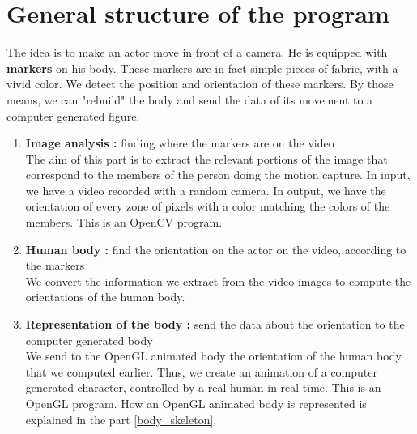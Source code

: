 \documentclass{article}
\begin{document}
    \section{General structure of the program}
The idea is to make an actor move in front of a camera.
He is equipped with \textbf{markers} on his body.
These markers are in fact simple pieces of fabric, with a vivid color.
We detect the position and orientation of these markers.
By those means, we can "rebuild" the body and send the data of its movement
to a computer generated figure.

\begin{enumerate}
    \item \textbf{Image analysis : } finding where the markers are on the video\\
    The aim of this part is to extract the relevant portions of the image that
    correspond to the members of the person doing the motion capture.
    In input, we have a video recorded with a random camera.
    In output, we have the orientation of every zone of pixels with a color matching the colors of the members.
    This is an OpenCV \cite{OpenCV} program.

    \item \textbf{Human body :} find the orientation on the actor on the video, according to the markers\\
    We convert the information we extract from the video images
    to compute the orientations of the human body.

    \item \textbf{Representation of the body :} send the data about the orientation to the computer generated body\\
    We send to the OpenGL animated body the orientation of the human body that we computed earlier.
    Thus, we create an animation of a computer generated character, controlled by a real human in real time.
    This is an OpenGL \cite{OpenGL} program.
    How an OpenGL animated body is represented is explained in the part \ref{body_skeleton}.
\end{enumerate}


\end{document}
